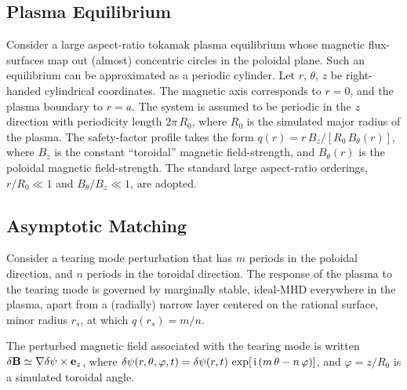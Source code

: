 \documentclass[12pt,prb,aps]{revtex4-1}
\begin{document}
\subsection{Plasma Equilibrium}
Consider a large aspect-ratio tokamak plasma equilibrium whose magnetic flux-surfaces map out
(almost) concentric circles in the poloidal plane. Such an equilibrium can be approximated as a
periodic cylinder.\cite{rf1993} Let $r$, $\theta$, $z$ be right-handed cylindrical coordinates. 
The magnetic axis corresponds to $r=0$, and the plasma boundary to $r=a$. The system is assumed to be periodic in the $z$
direction with periodicity length $2\pi\,R_0$, where $R_0$ is the simulated major radius of the plasma. The
safety-factor profile takes the form $q(r)=r\,B_z/[R_0\,B_\theta(r)]$, where $B_z$ is the constant
``toroidal'' magnetic field-strength, and $B_\theta(r)$ is the poloidal magnetic field-strength. The standard
large aspect-ratio orderings, $r/R_0\ll 1$ and $B_\theta/B_z\ll 1$, are adopted. 

\subsection{Asymptotic Matching}\label{cyl}
Consider a tearing mode perturbation that has $m$ periods in the poloidal direction, and
$n$ periods in the toroidal direction. 
The response of the plasma to the tearing mode is
governed by marginally stable, ideal-MHD everywhere in the plasma, apart from a (radially) narrow
layer centered on the rational surface, minor radius $r_s$, at which $q(r_s)=m/n$.\cite{fkr}

The perturbed magnetic field associated with the tearing mode is written $\delta{\bf B} \simeq \nabla\delta\psi\times{\bf e}_z$,  
where
$\delta\psi(r,\theta,\varphi,t)= \delta\psi(r,t)\,\exp[\,{\rm i}\,(m\,\theta-n\,\varphi)]$, 
and $\varphi=z/R_0$ is a simulated toroidal angle. 
\end{document}
